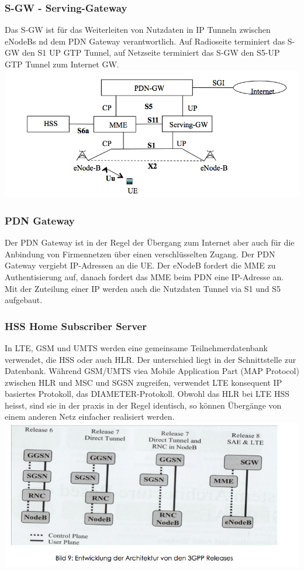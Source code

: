 \subsubsection{S-GW - Serving-Gateway}
Das S-GW ist für das Weiterleiten von Nutzdaten in IP Tunneln zwischen eNodeBs nd dem PDN Gateway verantwortlich. Auf Radioseite terminiert das S-GW den S1 UP GTP Tunnel, auf Netzseite terminiert das S-GW den S5-UP GTP Tunnel zum Internet GW.\\ 
\includegraphics[width = 0.5 \linewidth]{./Pics/LTE6.png}

\subsubsection{PDN Gateway}
Der PDN Gateway ist in der Regel der Übergang zum Internet aber auch für die Anbindung von Firmennetzen über einen verschlüsselten Zugang. Der PDN Gateway vergiebt IP-Adressen an die UE. Der eNodeB fordert die MME zu Authentisierung auf, danach fordert das MME beim PDN eine IP-Adresse an.  Mit der Zuteilung einer IP werden auch die Nutzdaten Tunnel via S1 und S5 aufgebaut.

\subsubsection{HSS Home Subscriber Server}
In LTE, GSM und UMTS werden eine gemeinsame Teilnehmerdatenbank verwendet, die HSS oder auch HLR. Der unterschied liegt in der Schnittstelle zur Datenbank. Während GSM/UMTS viea Mobile Application Part (MAP Protocol) zwischen HLR und MSC und SGSN zugreifen, verwendet LTE konsequent IP basiertes Protokoll, das DIAMETER-Protokoll.
Obwohl das HLR bei LTE HSS heisst, sind sie in der praxis in der Regel identisch, so können Übergänge von einem anderen Netz einfacher realisiert werden. \\ 
\includegraphics[width = 0.75 \linewidth]{./Pics/LTE7.png}
